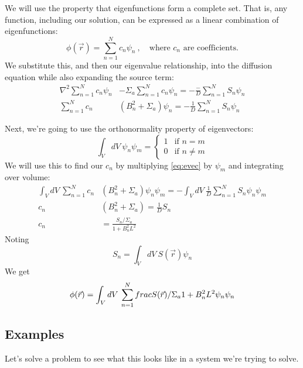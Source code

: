 \documentclass[12pt]{article}
\begin{document}
We will use the property that eigenfunctions form a complete set. That is, any function, including our solution, can be expressed as a linear combination of eigenfunctions:
\[
\phi(\vec{r}) = \sum_{n=1}^N c_n \psi_n\:, \quad \text{where } c_n \text{ are coefficients.}
\]
We substitute this, and then our eigenvalue relationship, into the diffusion equation while also expanding the source term:
\begin{align}
\nabla^2\sum_{n=1}^N c_n \psi_n &- \Sigma_a\sum_{n=1}^N c_n \psi_n = -\frac{-}{D}\sum_{n=1}^N S_n \psi_n \nonumber \\
%
\sum_{n=1}^N c_n &(B_n^2 + \Sigma_a)\psi_n = -\frac{1}{D}\sum_{n=1}^N S_n \psi_n
\label{eq:evec}
\end{align}

Next, we're going to use the orthonormality property of eigenvectors:
\[
\int_V dV\: \psi_n \psi_m = \left\{
	\begin{array}{ll}
		1  & \mbox{if } n = m \\
		0 & \mbox{if } n \neq m
	\end{array}
	\right.
\]
We will use this to find our $c_n$ by multiplying \autoref{eq:evec} by $\psi_m$ and integrating over volume:
\begin{align*}
\int_V dV\: \sum_{n=1}^N c_n &(B_n^2 + \Sigma_a)\psi_n \psi_m = -\int_V dV\:\frac{1}{D}\sum_{n=1}^N S_n \psi_n \psi_m \\
%
c_n &(B_n^2 + \Sigma_a) = \frac{1}{D} S_n\\
c_n &= \frac{S_n / \Sigma_a}{1 + B_n^2  L^2}
\end{align*}
Noting 
\[
S_n = \int_V dV\: S(\vec{r}) \psi_n
\]
We get
\[
\phi(\vec{r}) = \int_V dV\:\sum_{n=1}^N \\frac{S(\vec{r}) / \Sigma_a}{1 + B_n^2  L^2} \psi_n \psi_n 
\]

\subsection*{Examples}
Let's solve a problem to see what this looks like in a system we're trying to solve. 
\end{document}
